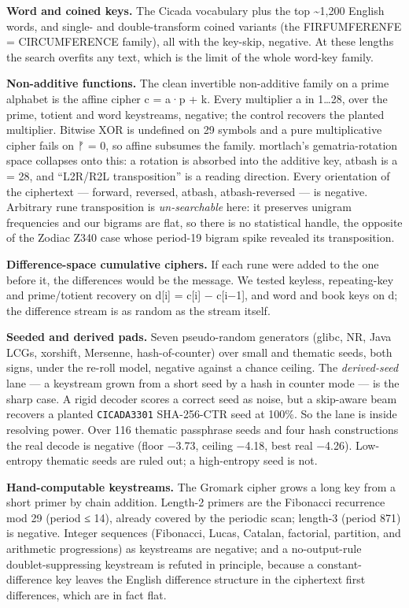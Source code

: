 \documentclass[11pt]{article}
\begin{document}
\textbf{Word and coined keys.} The Cicada vocabulary plus the top \textasciitilde{}1,200 English words, and single- and double-transform coined variants (the FIRFUMFERENFE = CIRCUMFERENCE family), all with the key-skip, negative. At these lengths the search overfits any text, which is the limit of the whole word-key family.

\textbf{Non-additive functions.} The clean invertible non-additive family on a prime alphabet is the affine cipher c = a·p + k. Every multiplier a in 1…28, over the prime, totient and word keystreams, negative; the control recovers the planted multiplier. Bitwise XOR is undefined on 29 symbols and a pure multiplicative cipher fails on ᚠ = 0, so affine subsumes the family. mortlach's gematria-rotation space collapses onto this: a rotation is absorbed into the additive key, atbash is a = 28, and ``L2R/R2L transposition'' is a reading direction. Every orientation of the ciphertext --- forward, reversed, atbash, atbash-reversed --- is negative. Arbitrary rune transposition is \emph{un-searchable} here: it preserves unigram frequencies and our bigrams are flat, so there is no statistical handle, the opposite of the Zodiac Z340 case \cite{oranchak2024} whose period-19 bigram spike revealed its transposition.

\textbf{Difference-space cumulative ciphers.} If each rune were added to the one before it, the differences would be the message. We tested keyless, repeating-key and prime/totient recovery on d[i] = c[i] − c[i−1], and word and book keys on d; the difference stream is as random as the stream itself.

\textbf{Seeded and derived pads.} Seven pseudo-random generators (glibc, NR, Java LCGs, xorshift, Mersenne, hash-of-counter) over small and thematic seeds, both signs, under the re-roll model, negative against a chance ceiling. The \emph{derived-seed} lane --- a keystream grown from a short seed by a hash in counter mode --- is the sharp case. A rigid decoder scores a correct seed as noise, but a skip-aware beam recovers a planted \texttt{CICADA3301} SHA-256-CTR seed at 100\%. So the lane is inside resolving power. Over 116 thematic passphrase seeds and four hash constructions the real decode is negative (floor −3.73, ceiling −4.18, best real −4.26). Low-entropy thematic seeds are ruled out; a high-entropy seed is not.

\textbf{Hand-computable keystreams.} The Gromark cipher grows a long key from a short primer by chain addition. Length-2 primers are the Fibonacci recurrence mod 29 (period ≤ 14), already covered by the periodic scan; length-3 (period 871) is negative. Integer sequences (Fibonacci, Lucas, Catalan, factorial, partition, and arithmetic progressions) as keystreams are negative; and a no-output-rule doublet-suppressing keystream is refuted in principle, because a constant-difference key leaves the English difference structure in the ciphertext first differences, which are in fact flat.
\end{document}
